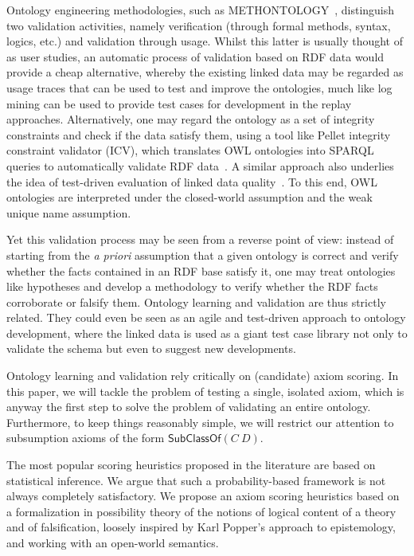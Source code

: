 \documentclass{sig-alternate}
\begin{document}
Ontology engineering methodologies, such as METHONTOLOGY~\cite{FernandezGomezJuristo1997},
distinguish two validation activities, namely verification (through formal methods, syntax, logics, etc.)
and validation through usage. Whilst this latter is usually thought of as user studies,
an automatic process of validation based on RDF data would provide a cheap alternative,
whereby the existing linked data may be regarded as usage traces that can be used
to test and improve the ontologies, much like log mining can be used to provide
test cases for development in the replay approaches.
Alternatively, one may regard the ontology as a set of integrity constraints and check if the
data satisfy them, using a tool like Pellet integrity constraint validator (ICV),
which translates OWL ontologies into SPARQL queries to automatically validate RDF data~\cite{SirinTao2009}.
A similar approach also underlies the idea of test-driven evaluation of linked data 
quality~\cite{KontokostasWestphalAuerHellmannLehmannCornelissen2014}.
To this end, OWL ontologies are interpreted under the closed-world assumption and
the weak unique name assumption. 

Yet this validation process may be seen from a reverse point of view:
instead of starting from the \emph{a priori} assumption that a given ontology
is correct and verify whether the facts contained in an RDF base satisfy it,
one may treat ontologies like hypotheses and develop a methodology to verify
whether the RDF facts corroborate or falsify them. Ontology learning and validation
are thus strictly related.
They could even be seen as an agile and test-driven approach to ontology development,
where the linked data is used as a giant test case library not only to validate the
schema but even to suggest new developments.

Ontology learning and validation rely critically on (candidate) axiom scoring.
In this paper, we will tackle the problem of testing a single, isolated axiom,
which is anyway the first step to solve the problem of validating an entire ontology.
Furthermore, to keep things reasonably simple, we will restrict our attention
to subsumption axioms of the form $\mathsf{SubClassOf}(C\ D)$.

The most popular scoring heuristics proposed in the literature are based on statistical inference.
We argue that such a probability-based framework is not always completely satisfactory.
We propose an axiom scoring heuristics based on a formalization in possibility theory of
the notions of logical content of a theory and of falsification, loosely inspired
by Karl Popper's approach to epistemology, and working with an open-world semantics.
\end{document}
